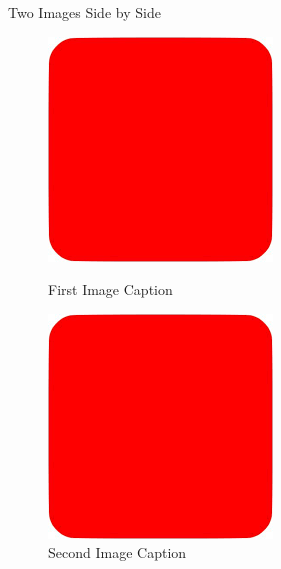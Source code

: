 \begin{frame}{Two Images Side by Side}
\begin{figure}
    \centering
    \begin{minipage}{0.48\textwidth}
        \centering
        \includegraphics[width=\linewidth]{assets/placeholder.png}
        \caption{First Image Caption}
    \end{minipage}\hfill
    \begin{minipage}{0.48\textwidth}
        \centering
        \includegraphics[width=\linewidth]{assets/placeholder.png}
        \caption{Second Image Caption}
    \end{minipage}
\end{figure}
\end{frame}
